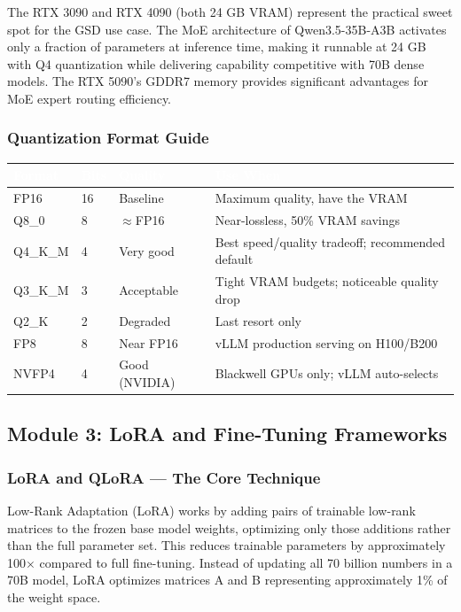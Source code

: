 \documentclass[11pt,letterpaper]{article}
\newcommand{\tableheader}[1]{\textbf{\sffamily\textcolor{white}{#1}}}
\begin{document}
The RTX 3090 and RTX 4090 (both 24 GB VRAM) represent the practical sweet spot for the GSD use case. The MoE architecture of Qwen3.5-35B-A3B activates only a fraction of parameters at inference time, making it runnable at 24 GB with Q4 quantization while delivering capability competitive with 70B dense models. The RTX 5090's GDDR7 memory provides significant advantages for MoE expert routing efficiency.

\subsubsection{Quantization Format Guide}

\begin{center}
\begin{tabularx}{\textwidth}{L{2.5cm}L{2cm}L{2cm}X}
\toprule
{}
\tableheader{Format} & \tableheader{Bits} & \tableheader{Quality} & \tableheader{Use When} \\
\midrule
FP16 & 16 & Baseline & Maximum quality, have the VRAM \\
Q8\_0 & 8 & $\approx$FP16 & Near-lossless, 50\% VRAM savings \\
Q4\_K\_M & 4 & Very good & Best speed/quality tradeoff; recommended default \\
Q3\_K\_M & 3 & Acceptable & Tight VRAM budgets; noticeable quality drop \\
Q2\_K & 2 & Degraded & Last resort only \\
FP8 & 8 & Near FP16 & vLLM production serving on H100/B200 \\
NVFP4 & 4 & Good (NVIDIA) & Blackwell GPUs only; vLLM auto-selects \\
\bottomrule
\end{tabularx}
\end{center}

\subsection{Module 3: LoRA and Fine-Tuning Frameworks}

\subsubsection{LoRA and QLoRA --- The Core Technique}

Low-Rank Adaptation (LoRA) works by adding pairs of trainable low-rank matrices to the frozen base model weights, optimizing only those additions rather than the full parameter set. This reduces trainable parameters by approximately 100$\times$ compared to full fine-tuning. Instead of updating all 70 billion numbers in a 70B model, LoRA optimizes matrices A and B representing approximately 1\% of the weight space.
\end{document}
